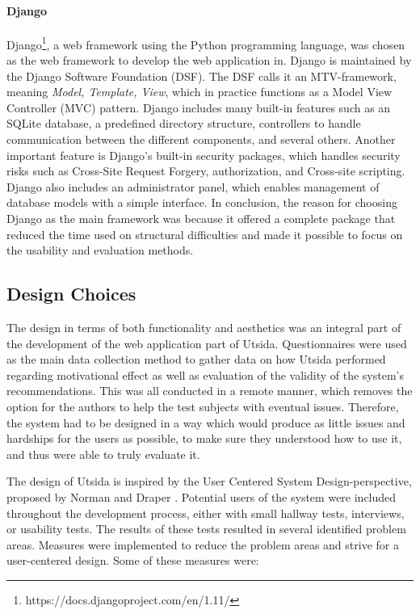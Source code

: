 \paragraph{Django}\label{sec:django}

Django\footnote{https://docs.djangoproject.com/en/1.11/}, a web framework using the Python programming language, was chosen as the web framework to develop the web application in. Django is maintained by the Django Software Foundation (DSF). The DSF calls it an MTV-framework, meaning \emph{Model, Template, View}, which in practice functions as a Model View Controller (MVC) pattern. Django includes many built-in features such as an SQLite database, a predefined directory structure, controllers to handle communication between the different components, and several others. Another important feature is Django's built-in security packages, which handles security risks such as Cross-Site Request Forgery, authorization, and Cross-site scripting. Django also includes an administrator panel, which enables management of database models with a simple interface. In conclusion, the reason for choosing Django as the main framework was because it offered a complete package that reduced the time used on structural difficulties and made it possible to focus on the usability and evaluation methods.

\subsection{Design Choices}
The design in terms of both functionality and aesthetics was an integral part of the development of the web application part of Utsida. Questionnaires were used as the main data collection method to gather data on how Utsida performed regarding motivational effect as well as evaluation of the validity of the system's recommendations. This was all conducted in a remote manner, which removes the option for the authors to help the test subjects with eventual issues. Therefore, the system had to be designed in a way which would produce as little issues and hardships for the users as possible, to make sure they understood how to use it, and thus were able to truly evaluate it.

The design of Utsida is inspired by the User Centered System Design-perspective, proposed by Norman and Draper \cite{norman1986user}. Potential users of the system were included throughout the development process, either with small hallway tests, interviews, or usability tests. The results of these tests resulted in several identified problem areas. Measures were implemented to reduce the problem areas and strive for a user-centered design. Some of these measures were:

